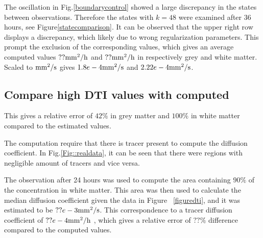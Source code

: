 \documentclass[11pt,a4paper]{article}
\begin{document}
The oscillation in Fig.\ref{boundarycontrol} showed a large discrepancy in the states between observations. Therefore the states with $k=48$ were examined after 36 hours, see Figure\ref{statecomparison}. It can be observed that the upper right row displays a discrepancy, which likely due to wrong regularization parameters. This prompt the exclusion of the corresponding values, which gives an average computed values $?? \mathrm{mm\sp{2}/h}$ and  $?? \mathrm{mm\sp{2}/h}$ in respectively grey and white matter. Scaled to $\mathrm{mm\sp{2}/s}$ gives $1.8e-4\mathrm{mm\sp{2}/s}$ and $2.22e-4 \mathrm{mm\sp{2}/s}$. 







\subsection*{Compare high DTI values with computed}
This gives a relative error of $42 \%$ in grey matter and $ 100 \%$ in white matter compared to the estimated values.

The computation require that there is tracer present to compute the diffusion coefficient. In Fig.\ref{Fig::realdata}, it can be seen that there were regions with negligible amount of tracers and vice versa. 

The observation after 24 hours was used to compute the area containing $90\%$ of the  concentration in white matter. This area was then used to calculate the median diffusion coefficient given the data in Figure ~\ref{figuredti}, and it was estimated to be  $?? e-3 \mathrm{mm\sp{2}/s}$. This correspondence to a tracer diffusion coefficient of $??e-4 \mathrm{mm\sp{2}/h}$ , which gives a relative error of $??\%$ difference compared to the computed values.


















\end{document}
